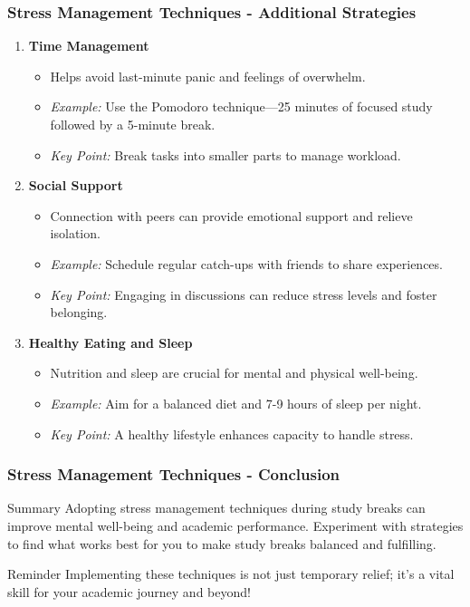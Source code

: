 \documentclass[aspectratio=169]{beamer}
\begin{document}
\begin{frame}[fragile]
    \frametitle{Stress Management Techniques - Additional Strategies}
    \begin{enumerate}[resume]
        \item \textbf{Time Management}
        \begin{itemize}
            \item Helps avoid last-minute panic and feelings of overwhelm.
            \item \textit{Example:} Use the Pomodoro technique—25 minutes of focused study followed by a 5-minute break.
            \item \textit{Key Point:} Break tasks into smaller parts to manage workload.
        \end{itemize}
        
        \item \textbf{Social Support}
        \begin{itemize}
            \item Connection with peers can provide emotional support and relieve isolation.
            \item \textit{Example:} Schedule regular catch-ups with friends to share experiences.
            \item \textit{Key Point:} Engaging in discussions can reduce stress levels and foster belonging.
        \end{itemize}
        
        \item \textbf{Healthy Eating and Sleep}
        \begin{itemize}
            \item Nutrition and sleep are crucial for mental and physical well-being.
            \item \textit{Example:} Aim for a balanced diet and 7-9 hours of sleep per night.
            \item \textit{Key Point:} A healthy lifestyle enhances capacity to handle stress.
        \end{itemize}
    \end{enumerate}
\end{frame}

\begin{frame}[fragile]
    \frametitle{Stress Management Techniques - Conclusion}
    \begin{block}{Summary}
        Adopting stress management techniques during study breaks can improve mental well-being and academic performance. 
        Experiment with strategies to find what works best for you to make study breaks balanced and fulfilling.
    \end{block}
    \begin{block}{Reminder}
        Implementing these techniques is not just temporary relief; it’s a vital skill for your academic journey and beyond!
    \end{block}
\end{frame}
\end{document}
